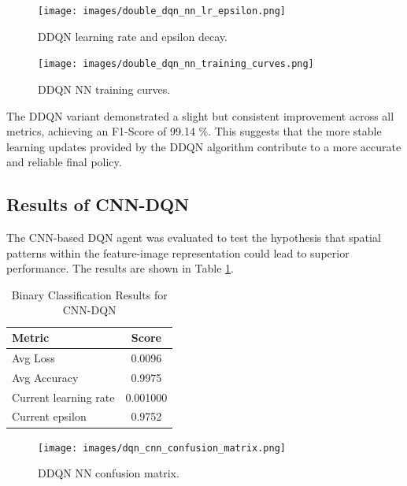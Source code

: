 \documentclass[16pt]{report}
\begin{document}
\vspace{0.5cm}

\begin{figure}[htbp]
    \centering
    \texttt{[image: images/double\_dqn\_nn\_lr\_epsilon.png]}
    \caption{DDQN learning rate and epsilon decay.}
    \label{fig:ddqn_lr_epsilon}
\end{figure}

\vspace{0.5cm}

\begin{figure}[htbp]
    \centering
    \texttt{[image: images/double\_dqn\_nn\_training\_curves.png]}
    \caption{DDQN NN training curves.}
    \label{fig:ddqn_training_curves}
\end{figure}

The DDQN variant demonstrated a slight but consistent improvement across all metrics, achieving an F1-Score of 99.14 \%. This suggests that the more stable learning updates provided by the DDQN algorithm contribute to a more accurate and reliable final policy.

\newpage
\subsection{Results of CNN-DQN}
The CNN-based DQN agent was evaluated to test the hypothesis that spatial patterns within the feature-image representation could lead to superior performance. The results are shown in Table \ref{tab:binary_cnn_dqn_results}.

\begin{table}[H]
    \centering
    \caption{Binary Classification Results for CNN-DQN}
    \label{tab:binary_cnn_dqn_results}
    \begin{tabular}{@{}lc@{}}
        \toprule
        \textbf{Metric} & \textbf{Score} \\
        \midrule
        Avg Loss & 0.0096\\
        Avg Accuracy & 0.9975 \\
        Current learning rate & 0.001000 \\
        Current epsilon & 0.9752 \\
        \bottomrule
    \end{tabular}
\end{table}

\begin{figure}[htbp]
    \centering
    \texttt{[image: images/dqn\_cnn\_confusion\_matrix.png]}
    \caption{DDQN NN confusion matrix.}
    \label{fig:ddqn_confusion}
\end{figure}
\end{document}
